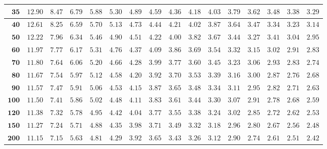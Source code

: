 \begin{longtable}{|r|r|r|r|r|r|r|r|r|r|r|r|r|r|r|r|}
    \(\mathbf{35}\) & \(12.90\) & \(8.47\) & \(6.79\) & \(5.88\) & \(5.30\) & \(4.89\) & \(4.59\) & \(4.36\) & \(4.18\) & \(4.03\) & \(3.79\) & \(3.62\) & \(3.48\) & \(3.38\) & \(3.29\) \\ \hline 
    \(\mathbf{40}\) & \(12.61\) & \(8.25\) & \(6.59\) & \(5.70\) & \(5.13\) & \(4.73\) & \(4.44\) & \(4.21\) & \(4.02\) & \(3.87\) & \(3.64\) & \(3.47\) & \(3.34\) & \(3.23\) & \(3.14\) \\ \hline 
    \(\mathbf{50}\) & \(12.22\) & \(7.96\) & \(6.34\) & \(5.46\) & \(4.90\) & \(4.51\) & \(4.22\) & \(4.00\) & \(3.82\) & \(3.67\) & \(3.44\) & \(3.27\) & \(3.41\) & \(3.04\) & \(2.95\) \\ \hline 
    \(\mathbf{60}\) & \(11.97\) & \(7.77\) & \(6.17\) & \(5.31\) & \(4.76\) & \(4.37\) & \(4.09\) & \(3.86\) & \(3.69\) & \(3.54\) & \(3.32\) & \(3.15\) & \(3.02\) & \(2.91\) & \(2.83\) \\ \hline 
    \(\mathbf{70}\) & \(11.80\) & \(7.64\) & \(6.06\) & \(5.20\) & \(4.66\) & \(4.28\) & \(3.99\) & \(3.77\) & \(3.60\) & \(3.45\) & \(3.23\) & \(3.06\) & \(2.93\) & \(2.83\) & \(2.74\) \\ \hline 
    \(\mathbf{80}\) & \(11.67\) & \(7.54\) & \(5.97\) & \(5.12\) & \(4.58\) & \(4.20\) & \(3.92\) & \(3.70\) & \(3.53\) & \(3.39\) & \(3.16\) & \(3.00\) & \(2.87\) & \(2.76\) & \(2.68\) \\ \hline 
    \(\mathbf{90}\) & \(11.57\) & \(7.47\) & \(5.91\) & \(5.06\) & \(4.53\) & \(4.15\) & \(3.87\) & \(3.65\) & \(3.48\) & \(3.34\) & \(3.11\) & \(2.95\) & \(2.82\) & \(2.71\) & \(2.63\) \\ \hline 
    \(\mathbf{100}\) & \(11.50\) & \(7.41\) & \(5.86\) & \(5.02\) & \(4.48\) & \(4.11\) & \(3.83\) & \(3.61\) & \(3.44\) & \(3.30\) & \(3.07\) & \(2.91\) & \(2.78\) & \(2.68\) & \(2.59\) \\ \hline 
    \(\mathbf{120}\) & \(11.38\) & \(7.32\) & \(5.78\) & \(4.95\) & \(4.42\) & \(4.04\) & \(3.77\) & \(3.55\) & \(3.38\) & \(3.24\) & \(3.02\) & \(2.85\) & \(2.72\) & \(2.62\) & \(2.53\) \\ \hline 
    \(\mathbf{150}\) & \(11.27\) & \(7.24\) & \(5.71\) & \(4.88\) & \(4.35\) & \(3.98\) & \(3.71\) & \(3.49\) & \(3.32\) & \(3.18\) & \(2.96\) & \(2.80\) & \(2.67\) & \(2.56\) & \(2.48\) \\ \hline 
    \(\mathbf{200}\) & \(11.15\) & \(7.15\) & \(5.63\) & \(4.81\) & \(4.29\) & \(3.92\) & \(3.65\) & \(3.43\) & \(3.26\) & \(3.12\) & \(2.90\) & \(2.74\) & \(2.61\) & \(2.51\) & \(2.42\) \\ \hline 

\end{longtable}
